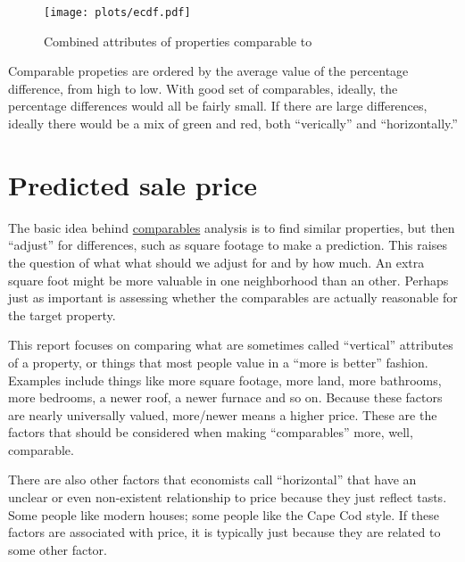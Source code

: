\documentclass[
12pt, %
letterpaper, %
oneside, %
headinclude,footinclude, %
BCOR5mm, %
]{scrartcl}
\begin{document}
\begin{figure}
\centering
\caption{Combined attributes of properties comparable to \PropertyName{}} \label{fig:ecdf}  
\texttt{[image: plots/ecdf.pdf]} 
\end{figure}

Comparable propeties are ordered by the average value of the percentage difference, from high to low. 
With good set of comparables, ideally, the percentage differences would all be fairly small.
If there are large differences, ideally there would be a mix of green and red, both ``verically'' and ``horizontally.'' 


\section{Predicted sale price}
The basic idea behind \href{https://en.wikipedia.org/wiki/Comparables}{comparables} analysis is to find similar properties, but then ``adjust'' for differences, such as square footage to make a prediction.
This raises the question of what what should we adjust for and by how much.
An extra square foot might be more valuable in one neighborhood than an other. 
Perhaps just as important is assessing whether the comparables are actually reasonable for the target property. 

This report focuses on comparing what are sometimes called ``vertical'' attributes of a property, or things that most people value in a ``more is better'' fashion.
Examples include things like more square footage, more land, more bathrooms, more bedrooms, a newer roof, a newer furnace and so on.
Because these factors are nearly universally valued, more/newer means a higher price.
These are the factors that should be considered when making ``comparables'' more, well, comparable. 

There are also other factors that economists call ``horizontal'' that have an unclear or even non-existent relationship to price because they just reflect tasts.  
Some people like modern houses; some people like the Cape Cod style.
If these factors are associated with price, it is typically just because they are related to some other factor.
\end{document}
